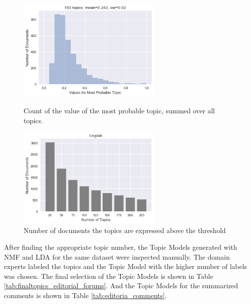 \begin{figure}
	\centering
	\begin{minipage}[b]{0.5\textwidth}
		\includegraphics[width=7cm]{gfx/Hyperparams/150topics_English_nmf.png}
		\caption{Count of the value of the most probable topic, summed over all topics.}
		\label{fig:mean}
	\end{minipage}%
	\begin{minipage}[b]{0.5\textwidth}
		\includegraphics[width=7cm]{gfx/Hyperparams/English_nmf_Comments.png}
		\caption{Number of documents the topics are expressed above the threshold}
		\label{fig:topic number}
	\end{minipage}
\end{figure}	

After finding the appropriate topic number, the Topic Models generated with \ac{NMF} and \ac{LDA} for the same dataset were inspected manually. The domain experts labeled the topics and the Topic Model with the higher number of labels was chosen. The final selection of the Topic Models is shown in Table \ref{tab:finaltopics_editorial_forums}. And the Topic Models for the summarized comments is shown in Table \ref{tab:editoria_comments}. \\


